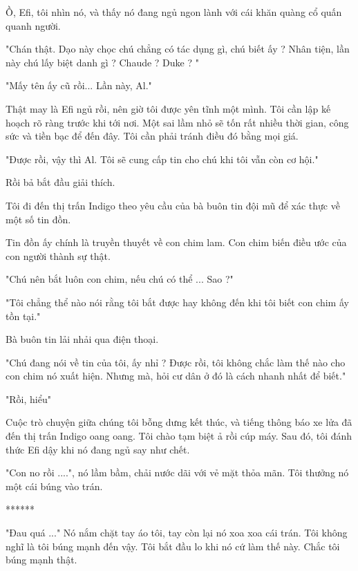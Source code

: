 Ồ, Efi, tôi nhìn nó, và thấy nó đang ngủ ngon lành với cái khăn quàng cổ quấn quanh người. 

"Chán thật. Dạo này chọc chú chẳng có tác dụng gì, chú biết ấy ? Nhân tiện, lần này chú lấy biệt danh gì ? Chaude ? Duke ? "

"Mấy tên ấy cũ rồi... Lần này, Al."

Thật may là Efi ngủ rồi, nên giờ tôi được yên tĩnh một mình. Tôi cần lập kế hoạch rõ ràng trước khi tới nơi. Một sai lầm nhỏ sẽ tốn rất nhiều thời gian, công sức và tiền bạc để đến đây. Tôi cần phải tránh điều đó bằng mọi giá.

"Được rồi, vậy thì Al. Tôi sẽ cung cấp tin cho chú khi tôi vẫn còn cơ hội."

Rồi bả bắt đầu giải thích. 

Tôi đi đến thị trấn Indigo theo yêu cầu của bà buôn tin đội mũ để xác thực về một số tin đồn. 

Tin đồn ấy chính là truyền thuyết về con chim lam. Con chim biến điều ước của con người thành sự thật.
 
"Chú nên bắt luôn con chim, nếu chú có thể ... Sao ?"

"Tôi chẳng thể nào nói rằng tôi bắt được hay không đến khi tôi biết con chim ấy tồn tại."

Bà buôn tin lải nhải qua điện thoại.

"Chú đang nói về tin của tôi, ấy nhỉ ? Được rồi, tôi không chắc làm thế nào cho con chim nó xuất hiện. Nhưng mà, hỏi cư dân ở đó là cách nhanh nhất để biết."

"Rồi, hiểu"

Cuộc trò chuyện giữa chúng tôi bỗng dưng kết thúc, và tiếng thông báo xe lửa đã đến thị trấn Indigo oang oang. Tôi chào tạm biệt ả rồi cúp máy. Sau đó, tôi đánh thức Efi dậy khi nó đang ngủ say như chết. 

"Con no rồi ....", nó lầm bầm, chải nước dãi với vẻ mặt thỏa mãn. Tôi thưởng nó một cái búng vào trán. \\


\begin{center}
	******
\end{center}



"Đau quá ..." Nó nắm chặt tay áo tôi, tay còn lại nó xoa xoa cái trán. 
Tôi không nghĩ là tôi búng mạnh đến vậy. Tôi bắt đầu lo khi nó cứ làm thế này. Chắc tôi búng mạnh thật. 

